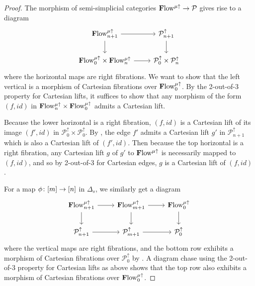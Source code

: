 \documentclass[10pt]{amsart}
\numberwithin{equation}{section}
\theoremstyle{definition}
\newcommand{\bfPreFlow}{\mathbf{F}\mathrm{low}\vphantom{w}}
\newcommand{\Simp}{\mathbb{\Delta}}
\newcommand{\cP}{\mathcal{P}}
\renewcommand{\to}{\mathchoice{\longrightarrow}{\rightarrow}{}{}}
\begin{document}
\begin{proof}
	The morphism of semi-simplicial categories $\bfPreFlow^{\mu\uparrow} \to \cP$ gives rise to a diagram
	\begin{equation*}
		\begin{tikzcd}
			\bfPreFlow^{\mu\uparrow}_{n+1}
			\arrow[r]
			\arrow[d]     &
			\cP^{\uparrow}_{n+1}
			\arrow[d] \\
			\bfPreFlow^{\mu\uparrow}_{0} \times \bfPreFlow^{\mu\uparrow}_{n}
			\arrow[r]     &
			\cP^{\uparrow}_{0}\times \cP^{\uparrow}_{n}
		\end{tikzcd}
	\end{equation*}
	where the horizontal maps are right fibrations.
  We want to show that the left vertical is a morphism of Cartesian fibrations over $\bfPreFlow^{\mu\uparrow}_{0}$.
  By the 2-out-of-3 property for Cartesian lifts, it suffices to show that any morphism of the form $(f,id)$ in $\bfPreFlow^{\mu\uparrow}_{n} \times \bfPreFlow^{\mu\uparrow}_{0}$ admits a Cartesian lift.

	Because the lower horizontal is a right fibration, $(f,id)$ is a Cartesian lift of its image $(f',id)$ in $\cP^{\uparrow}_{0}\times \cP_{0}^{\uparrow}$.
  By , the edge $f'$ admits a Cartesian lift $g'$ in $\cP^{\uparrow}_{n+1}$ which is also a Cartesian lift of $(f',id)$. Then because the top horizontal is a right fibration, any Cartesian lift $g$ of $g'$ to $\bfPreFlow^{\mu\uparrow}$ is necessarily mapped to $(f,id)$, and so by 2-out-of-3 for Cartesian edges, $g$ is a Cartesian lift of $(f,id)$.


	For a map $\phi \colon [m] \to [n]$ in $\Simp_{s}$, we similarly get a diagram
	\begin{equation*}
		\begin{tikzcd}
			\bfPreFlow^{\mu\uparrow}_{n+1}
			\arrow[r]
			\arrow[d]    &
			\bfPreFlow^{\mu\uparrow}_{m+1}
			\arrow[d]
			\arrow[r]    &
			\bfPreFlow^{\mu\uparrow}_{0}
			\arrow[d]    \\
			\cP^{\uparrow}_{n+1}
			\arrow[r]    &
			\cP^{\uparrow}_{m+1}
			\arrow[r]    &
			\cP^{\uparrow}_{0}
		\end{tikzcd}
	\end{equation*}
	where the vertical maps are right fibrations, and the bottom row exhibits a morphism of Cartesian fibrations over $\cP_{0}^{\uparrow}$ by .
  A diagram chase using the 2-out-of-3 property for Cartesian lifts as above shows that the top row also exhibits a morphism of Cartesian fibrations over $\bfPreFlow^{\mu\uparrow}_{0}$.
\end{proof}
\end{document}
